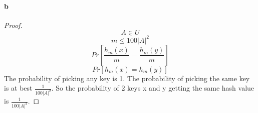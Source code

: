 \paragraph{b}
\begin{proof}
    \begin{equation*}
        A \in U
    \end{equation*}
    \begin{equation*}
        m \le 100|A|^{2}
    \end{equation*}
    \begin{equation*}
        Pr \left[ \frac{h_m(x)}{m} = \frac{h_m(y)}{m}\right]
    \end{equation*}
    \begin{equation*}
        Pr \left[ h_m(x) = h_m(y) \right]
    \end{equation*}
    The probability of picking any key is 1. The probability of picking the same key is at best $\frac{1}{100|A|^{2}}$.
    So the probability of 2 keys x and y getting the same hash value is $\frac{1}{100|A|^{2}}$.
\end{proof}



